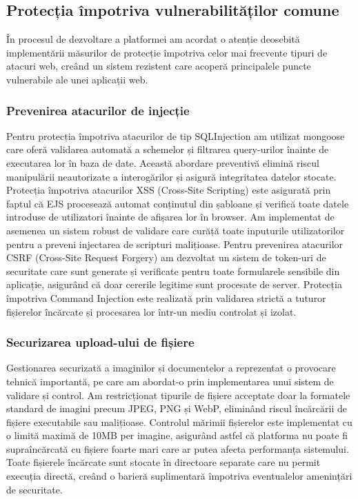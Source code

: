 \documentclass[12pt,a4paper]{report}
\begin{document}
\subsection{Protecția împotriva vulnerabilităților comune}
În procesul de dezvoltare a platformei am acordat o atenție deosebită implementării măsurilor de protecție împotriva celor mai frecvente tipuri de atacuri web, creând un sistem rezistent care acoperă principalele puncte vulnerabile ale unei aplicații web.
\subsubsection{Prevenirea atacurilor de injecție}
Pentru protecția împotriva atacurilor de tip SQLInjection am utilizat mongoose care oferă validarea automată a schemelor și filtrarea query-urilor înainte de executarea lor în baza de date. Această abordare preventivă elimină riscul manipulării neautorizate a interogărilor și asigură integritatea datelor stocate.
Protecția împotriva atacurilor XSS (Cross-Site Scripting) este asigurată prin faptul că EJS procesează automat conținutul din șabloane și verifică toate datele introduse de utilizatori înainte de afișarea lor în browser. Am implementat de asemenea un sistem robust de validare care curăță toate inputurile utilizatorilor pentru a preveni injectarea de scripturi malițioase.
Pentru prevenirea atacurilor CSRF (Cross-Site Request Forgery) am dezvoltat un sistem de token-uri de securitate care sunt generate și verificate pentru toate formularele sensibile din aplicație, asigurând că doar cererile legitime sunt procesate de server. Protecția împotriva Command Injection este realizată prin validarea strictă a tuturor fișierelor încărcate și procesarea lor într-un mediu controlat și izolat.
\subsubsection{Securizarea upload-ului de fișiere}
Gestionarea securizată a imaginilor și documentelor a reprezentat o provocare tehnică importantă, pe care am abordat-o prin implementarea unui sistem  de validare și control. Am restricționat tipurile de fișiere acceptate doar la formatele standard de imagini precum JPEG, PNG și WebP, eliminând riscul încărcării de fișiere executabile sau malițioase.
Controlul mărimii fișierelor este implementat cu o limită maximă de 10MB per imagine, asigurând astfel că platforma nu poate fi supraîncărcată cu fișiere foarte mari care ar putea afecta performanța sistemului. Toate fișierele încărcate sunt stocate în directoare separate care nu permit execuția directă, creând o barieră suplimentară împotriva eventualelor amenințări de securitate.
\end{document}
